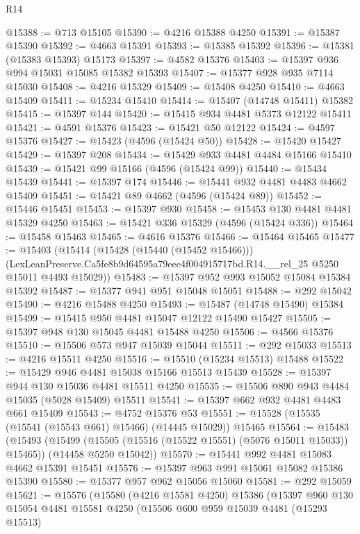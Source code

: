\begin{lexlean}{R14}
\begin{coremodule}
@15388 := @713 @15105
@15390 := @4216 @15388 @4250
@15391 := @15387 @15390
@15392 := @4663 @15391
@15393 := @15385 @15392
@15396 := @15381 (@15383 @15393) @15173
@15397 := @4582 @15376
@15403 := @15397 @936 @994 @15031 @15085 @15382 @15393
@15407 := @15377 @928 @935 @7114 @15030
@15408 := @4216 @15329
@15409 := @15408 @4250
@15410 := @4663 @15409
@15411 := @15234 @15410
@15414 := @15407 (@14748 @15411) @15382
@15415 := @15397 @144
@15420 := @15415 @934 @4481 @5373 @12122 @15411
@15421 := @4591 @15376
@15423 := @15421 @50 @12122
@15424 := @4597 @15376
@15427 := @15423 (@4596 (@15424 @50))
@15428 := @15420 @15427
@15429 := @15397 @208
@15434 := @15429 @933 @4481 @4484 @15166 @15410
@15439 := @15421 @99 @15166 (@4596 (@15424 @99))
@15440 := @15434 @15439
@15441 := @15397 @174
@15446 := @15441 @932 @4481 @4483 @4662 @15409
@15451 := @15421 @89 @4662 (@4596 (@15424 @89))
@15452 := @15446 @15451
@15453 := @15397 @930
@15458 := @15453 @130 @4481 @4481 @15329 @4250
@15463 := @15421 @336 @15329 (@4596 (@15424 @336))
@15464 := @15458 @15463
@15465 := @4616 @15376
@15466 := @15464 @15465
@15477 := @15403
    (@15414
      (@15428 (@15440 (@15452 @15466)))
      (LexLeanPreserve.Ca5fe8b9d64595a79eee4f004915717bd.R14.__rel_25 @5250 @15011 @4493 @15029))
@15483 := @15397 @952 @993 @15052 @15084 @15384 @15392
@15487 := @15377 @941 @951 @15048 @15051
@15488 := @292 @15042
@15490 := @4216 @15488 @4250
@15493 := @15487 (@14748 @15490) @15384
@15499 := @15415 @950 @4481 @15047 @12122 @15490 @15427
@15505 := @15397 @948 @130 @15045 @4481 @15488 @4250
@15506 := @4566 @15376
@15510 := @15506 @573 @947 @15039 @15044
@15511 := @292 @15033
@15513 := @4216 @15511 @4250
@15516 := @15510 (@15234 @15513) @15488
@15522 := @15429 @946 @4481 @15038 @15166 @15513 @15439
@15528 := @15397 @944 @130 @15036 @4481 @15511 @4250
@15535 := @15506 @890 @943 @4484 @15035 (@5028 @15409) @15511
@15541 := @15397 @662 @932 @4481 @4483 @661 @15409
@15543 := @4752 @15376 @53
@15551 := @15528 (@15535 (@15541 (@15543 @661) @15466) (@14445 @15029)) @15465
@15564 := @15483
    (@15493
      (@15499 (@15505 (@15516 (@15522 @15551) (@5076 @15011 @15033)) @15465))
      (@14458 @5250 @15042))
@15570 := @15441 @992 @4481 @15083 @4662 @15391 @15451
@15576 := @15397 @963 @991 @15061 @15082 @15386 @15390
@15580 := @15377 @957 @962 @15056 @15060
@15581 := @292 @15059
@15621 := @15576
    (@15580
      (@4216 @15581 @4250)
      @15386
      (@15397
        @960
        @130
        @15054
        @4481
        @15581
        @4250
        (@15506
          @600
          @959
          @15039
          @4481
          (@15293 @15513)

\end{coremodule}
\end{lexlean}

